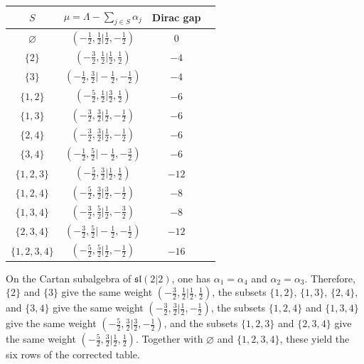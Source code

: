 \begin{example}
\begin{center}
\small
\renewcommand{\arraystretch}{1.1}
\setlength{\tabcolsep}{5pt}
\begin{tabular}{|c|c|c|c|}
\hline
$S$
&
$\mu=\Lambda-\displaystyle\sum_{j\in S}\alpha_j$
&
Dirac gap
\\
\hline
$\varnothing$
& $(-\tfrac12,\tfrac12\vert\tfrac12,-\tfrac12)$
& $0$
\\
\hline
$\{2\}$
& $(-\tfrac32,\tfrac12\vert\tfrac12,\tfrac12)$
& $-4$
\\
\hline
$\{3\}$
& $(-\tfrac12,\tfrac32\vert-\tfrac12,-\tfrac12)$
& $-4$
\\
\hline
$\{1,2\}$
& $(-\tfrac52,\tfrac12\vert\tfrac32,\tfrac12)$
& $-6$
\\
\hline
$\{1,3\}$
& $(-\tfrac32,\tfrac32\vert\tfrac12,-\tfrac12)$
& $-6$
\\
\hline
$\{2,4\}$
& $(-\tfrac32,\tfrac32\vert\tfrac12,-\tfrac12)$
& $-6$
\\
\hline
$\{3,4\}$
& $(-\tfrac12,\tfrac52\vert-\tfrac12,-\tfrac32)$
& $-6$
\\
\hline
$\{1,2,3\}$
& $(-\tfrac52,\tfrac32\vert\tfrac12,\tfrac12)$
& $-12$
\\
\hline
$\{1,2,4\}$
& $(-\tfrac52,\tfrac32\vert\tfrac32,-\tfrac12)$
& $-8$
\\
\hline
$\{1,3,4\}$
& $(-\tfrac32,\tfrac52\vert\tfrac12,-\tfrac32)$
& $-8$
\\
\hline
$\{2,3,4\}$
& $(-\tfrac32,\tfrac52\vert-\tfrac12,-\tfrac12)$
& $-12$
\\
\hline
$\{1,2,3,4\}$
& $(-\tfrac52,\tfrac52\vert\tfrac12,-\tfrac12)$
& $-16$
\\
\hline
\end{tabular}
\end{center}

On the Cartan subalgebra of $\mathfrak{sl}(2\vert2)$, one has
$\alpha_1=\alpha_4$ and $\alpha_2=\alpha_3$. Therefore,
$\{2\}$ and $\{3\}$ give the same weight
$(-\tfrac32,\tfrac12\vert\tfrac12,\tfrac12)$,
the subsets $\{1,2\}$, $\{1,3\}$, $\{2,4\}$, and $\{3,4\}$ give the same weight
$(-\tfrac32,\tfrac32\vert\tfrac12,-\tfrac12)$,
the subsets $\{1,2,4\}$ and $\{1,3,4\}$ give the same weight
$(-\tfrac52,\tfrac32\vert\tfrac32,-\tfrac12)$,
and the subsets $\{1,2,3\}$ and $\{2,3,4\}$ give the same weight
$(-\tfrac52,\tfrac32\vert\tfrac12,\tfrac12)$.
Together with $\varnothing$ and $\{1,2,3,4\}$, these yield the six rows of the corrected table.


\end{example}
